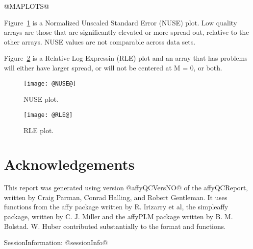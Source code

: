 \documentclass[11pt]{article}
\newcommand{\Rpackage}[1]{{\textsf{#1}}}
\begin{document}
@MAPLOTS@

Figure~\ref{fig:NUSE} is a Normalized Unscaled Standard Error (NUSE) 
plot.  Low quality arrays are those that are significantly elevated or 
more spread out, relative to the other arrays.
NUSE values are not comparable across data sets.

Figure~\ref{fig:RLE} is a Relative Log Expressin (RLE) plot
and an array that has problems will either have larger spread, or 
will not be centered at M = 0, or both.

\begin{figure}[tp]
  \centering
\texttt{[image: @NUSE@]}
\caption{\label{fig:NUSE}%
NUSE plot.}
\end{figure}

\begin{figure}[tp]
  \centering
\texttt{[image: @RLE@]}
\caption{\label{fig:RLE}%
RLE plot.}
\end{figure}

\section*{Acknowledgements}
\label{sec:ack}

This report was generated using version @affyQCVersNO@ of the 
\Rpackage{affyQCReport}, written by Craig Parman, Conrad Halling, and
Robert Gentleman. It uses functions from the \Rpackage{affy} package
written by R. Irizarry et al, the \Rpackage{simpleaffy} package, written
by C. J. Miller and the \Rpackage{affyPLM} package written by B. M. Bolstad.
W. Huber contributed substantially to the format and functions.

SessionInformation: 
@sessionInfo@
\end{document}

